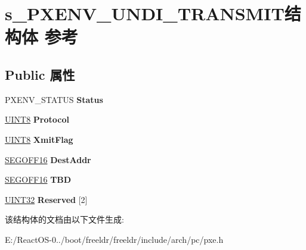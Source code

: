 \hypertarget{structs___p_x_e_n_v___u_n_d_i___t_r_a_n_s_m_i_t}{}\section{s\+\_\+\+P\+X\+E\+N\+V\+\_\+\+U\+N\+D\+I\+\_\+\+T\+R\+A\+N\+S\+M\+I\+T结构体 参考}
\label{structs___p_x_e_n_v___u_n_d_i___t_r_a_n_s_m_i_t}
\subsection*{Public 属性}
\begin{DoxyCompactItemize}
\item 
\mbox{\label{structs___p_x_e_n_v___u_n_d_i___t_r_a_n_s_m_i_t_ae65b36ec3967bc4149b045e88633658a}} 
P\+X\+E\+N\+V\+\_\+\+S\+T\+A\+T\+US {\bfseries Status}
\item 
\mbox{\label{structs___p_x_e_n_v___u_n_d_i___t_r_a_n_s_m_i_t_ae1d30f80508e92dfc2820409308c6efd}} 
\hyperlink{_processor_bind_8h_ab27e9918b538ce9d8ca692479b375b6a}{U\+I\+N\+T8} {\bfseries Protocol}
\item 
\mbox{\label{structs___p_x_e_n_v___u_n_d_i___t_r_a_n_s_m_i_t_a16a892dd29aeecc56124962e1c0a0dde}} 
\hyperlink{_processor_bind_8h_ab27e9918b538ce9d8ca692479b375b6a}{U\+I\+N\+T8} {\bfseries Xmit\+Flag}
\item 
\mbox{\label{structs___p_x_e_n_v___u_n_d_i___t_r_a_n_s_m_i_t_a4d0320c29c598d8e23ecd6733eb8d70d}} 
\hyperlink{structs___s_e_g_o_f_f16}{S\+E\+G\+O\+F\+F16} {\bfseries Dest\+Addr}
\item 
\mbox{\label{structs___p_x_e_n_v___u_n_d_i___t_r_a_n_s_m_i_t_a175dcb01e44eca1d187a50747b472efd}} 
\hyperlink{structs___s_e_g_o_f_f16}{S\+E\+G\+O\+F\+F16} {\bfseries T\+BD}
\item 
\mbox{\label{structs___p_x_e_n_v___u_n_d_i___t_r_a_n_s_m_i_t_a9fef1465373d1cd7e864b004debc81cf}} 
\hyperlink{_processor_bind_8h_ae1e6edbbc26d6fbc71a90190d0266018}{U\+I\+N\+T32} {\bfseries Reserved} \mbox{[}2\mbox{]}
\end{DoxyCompactItemize}


该结构体的文档由以下文件生成\+:\begin{DoxyCompactItemize}
\item 
E\+:/\+React\+O\+S-\/0../boot/freeldr/freeldr/include/arch/pc/pxe.\+h\end{DoxyCompactItemize}
